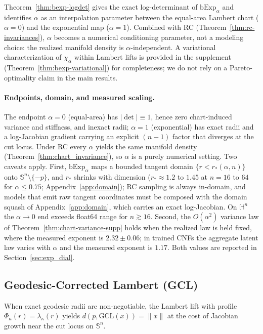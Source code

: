 \documentclass{article}
\theoremstyle{definition}
\theoremstyle{remark}
\newcommand{\bExp}{\mathrm{bExp}}
\newcommand{\SSS}{\mathbb{S}}
\newcommand{\HH}{\mathbb{H}}
\begin{document}
Theorem~\ref{thm:bexp-logdet} gives the exact log-determinant of $\bExp_\alpha$
and identifies $\alpha$ as an interpolation parameter between the equal-area
Lambert chart ($\alpha{=}0$) and the exponential map ($\alpha{=}1$). Combined
with RC (Theorem~\ref{thm:rc-invariances}), $\alpha$ becomes a numerical
conditioning parameter, not a modeling choice: the realized manifold
density is $\alpha$-independent. A variational characterization of $\chi_\alpha$
within Lambert lifts is provided in the supplement
(Theorem~\ref{thm:bexp-variational}) for completeness; we do not rely on a
Pareto-optimality claim in the main results.

\paragraph{Endpoints, domain, and measured scaling.} The endpoint $\alpha{=}0$ (equal-area) has $|\det|\equiv1$, hence zero chart-induced variance and stiffness, and inexact radii; $\alpha{=}1$ (exponential) has exact radii and a log-Jacobian gradient carrying an explicit $(n{-}1)$ factor that diverges at the cut locus. Under RC every $\alpha$ yields the same manifold density (Theorem~\ref{thm:chart_invariance}), so $\alpha$ is a purely numerical setting. Two caveats apply. First, $\bExp_\alpha$ maps a bounded tangent domain $\{r<r_*(\alpha,n)\}$ onto $\SSS^n\setminus\{-p\}$, and $r_*$ shrinks with dimension ($r_*\approx1.2$ to $1.45$ at $n{=}16$ to $64$ for $\alpha\le0.75$; Appendix~\ref{app:domain}); RC sampling is always in-domain, and models that emit raw tangent coordinates must be composed with the domain squash of Appendix~\ref{app:domain}, which carries an exact log-Jacobian. On $\HH^n$ the $\alpha\to0$ end exceeds float64 range for $n\gtrsim16$. Second, the $O(\alpha^2)$ variance law of Theorem~\ref{thm:chart-variance-supp} holds when the realized law is held fixed, where the measured exponent is $2.32\pm0.06$; in trained CNFs the aggregate latent law varies with $\alpha$ and the measured exponent is $1.17$. Both values are reported in Section~\ref{sec:exp_dial}.

\subsection{Geodesic-Corrected Lambert (GCL)}
When exact geodesic radii are non-negotiable, the Lambert lift with profile
$\Phi_\kappa(r)=\lambda_\kappa(r)$ yields $d(p,\mathrm{GCL}(x))=\|x\|$ at the
cost of Jacobian growth near the cut locus on $\SSS^n$. 
\end{document}
